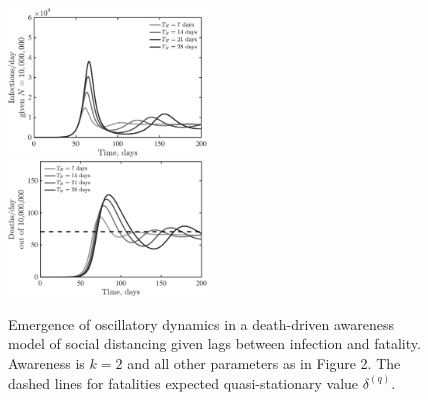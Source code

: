 \begin{figure}[t!]
\begin{center}
\includegraphics[width=0.47\textwidth]{scripts/figseir_Hdel_k2_noname.pdf}\\
\includegraphics[width=0.47\textwidth]{scripts/figseir_Hdel_k2D_noname.pdf}
\caption{Emergence of oscillatory dynamics in a death-driven awareness
model of social distancing given lags between infection and fatality.
Awareness is $k=2$ and all other parameters as in Figure 2.
The dashed
lines for fatalities expected quasi-stationary value $\delta^{(q)}$.
\label{fig.oscillate}}
\end{center}
\end{figure}

